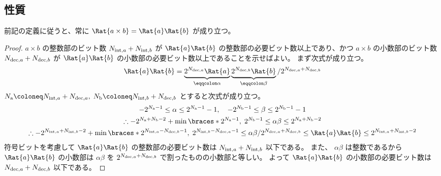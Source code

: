         \subsection{性質}
            \newcommand{\Na}{{N_\text{a}}}
            \newcommand{\Nb}{{N_\text{b}}}
            前記の定義に従うと、常に $\Rat{a\times b} = \Rat{a}\Rat{b}$ が成り立つ。
            \begin{proof}
                \quad\par
                $a\times b$ の整数部のビット数 ${N_{\text{int},a}}+{N_{\text{int},b}}$ が $\Rat{a}\Rat{b}$ の整数部の必要ビット数以上であり、かつ $a\times b$ の小数部のビット数 ${N_{\text{dec},a}}+{N_{\text{dec},b}}$ が $\Rat{a}\Rat{b}$ の小数部の必要ビット数以上であることを示せばよい。
                まず次式が成り立つ。
                \[ \Rat{a}\Rat{b} = \underbrace{2^\Nda\Rat{a}}_{\eqqcolon\alpha}\underbrace{2^\Ndb\Rat{b}}_{\eqqcolon\beta}/2^{\Nda+\Ndb} \]
                $\Na \coloneq \Nia + \Nda,\; \Nb \coloneq \Nib + \Ndb$ とすると次式が成り立つ。
                \begin{gather*}
                    -2^{\Na-1} \leq \alpha \leq 2^{\Na-1}-1,\quad -2^{\Nb-1} \leq \beta \leq 2^{\Nb-1}-1 \\
                    \therefore -2^{\Na+\Nb-2} + \min \braces*{2^{\Na-1},\; 2^{\Nb-1}} \leq \alpha\beta \leq 2^{\Na+\Nb-2} \\
                    \therefore -2^{\Nia+\Nib-2} + \min \braces*{2^{\Nia-\Ndb-1},\; 2^{\Nib-\Nda-1}} \leq \alpha\beta/2^{\Nda+\Ndb} \leq \Rat{a}\Rat{b} \leq 2^{\Nia+\Nib-2}
                \end{gather*}
                符号ビットを考慮して $\Rat{a}\Rat{b}$ の整数部の必要ビット数は ${N_{\text{int},a}}+{N_{\text{int},b}}$ 以下である。
                また、 $\alpha\beta$ は整数であるから $\Rat{a}\Rat{b}$ の小数部は $\alpha\beta$ を $2^{{N_{\text{dec},a}}+{N_{\text{dec},b}}}$ で割ったものの小数部と等しい。
                よって $\Rat{a}\Rat{b}$ の小数部の必要ビット数は ${N_{\text{dec},a}}+{N_{\text{dec},b}}$ 以下である。
            \end{proof}
